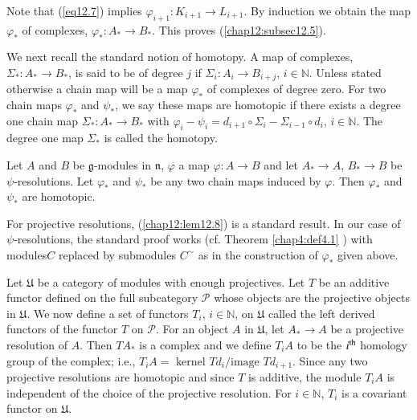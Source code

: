 Note that (\ref{eq12.7}) implies $\varphi_{i+1}: K_{i+1} \to L_{i+1}$. By
induction we obtain the map $\varphi_*$ of complexes, $\varphi_* : A_*
\to B_*$. This proves (\ref{chap12:subsec12.5}). 

We next recall the standard notion of homotopy. A map of complexes,
$\Sigma_* : A_* \to B_*$, is said to be of degree $j$ if $\Sigma_i :
A_i \to B_{i+j}$, $i \in \mathbb{N}$. Unless stated otherwise a chain
map will be a map $\varphi_*$ of complexes of degree zero. For two
chain maps $\varphi_*$ and $\psi_*$, we say these maps are homotopic
if there exists a degree one chain map $\Sigma_*: A_* \to B_*$ with
$\varphi_i - \psi_i = d_{i+1} \circ \Sigma_i - \Sigma_{i-1} \circ
d_i$, $i \in \mathbb{N}$. The degree one map $\Sigma_*$ is called the
homotopy. 

\setcounter{prop}{7}
\begin{lemma}\label{chap12:lem12.8}
Let $A$ and $B$ be $\mathfrak{g}$-modules  in $\mathfrak{n}$,
$\varphi$ a map $\varphi: A \to B$ and let $A_* \to A$, $B_* \to B$ be
$\psi$-resolutions. Let $\varphi_*$ and $\psi_*$ be any two chain maps
induced by $\varphi$. Then $\varphi_*$ and $\psi_*$ are homotopic. 
\end{lemma}

For projective resolutions, (\ref{chap12:lem12.8}) is a standard result. In our case
of $\psi$-resolutions, the standard proof works (cf. Theorem \ref{chap4:def4.1}
\cite{key23}) with modules\pageoriginale $C$ replaced by submodules
$C^\sim$ as in the construction of $\varphi_*$ given above.

Let $\mathfrak{U}$ be a category of modules with enough
projectives. Let $T$ be an additive functor defined on the full
subcategory $\mathscr{P}$ whose objects are the projective objects in
$\mathfrak{U}$. We now define a set of functors $T_i$, $i \in
\mathbb{N}$, on $\mathfrak{U}$ called the left derived functors of the
functor $T$ on $\mathscr{P}$. For an object $A$ in $\mathfrak{U}$, let
$A_* \to A$ be a projective resolution of $A$. Then $TA_*$ is a
complex and we define $T_i A$ to be the $i^{\rm th}$ homology group of
the complex; i.e., $T_i A = $ kernel $Td_i/ \text{image }
Td_{i+1}$. Since any two projective resolutions are homotopic and
since $T$ is additive, the module $T_i A$ is independent of the choice
of the projective resolution. For $i \in \mathbb{N}$, $T_i$ is a
covariant functor on $\mathfrak{U}$. 


